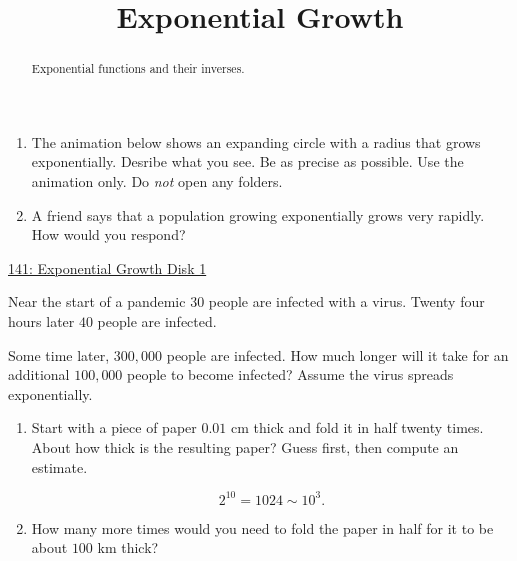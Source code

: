 \documentclass{ximera}
\title{Exponential Growth}
\begin{document}
\begin{abstract}
Exponential functions and their inverses.
\end{abstract}
\maketitle

\begin{exploration}  \label{Edftrg455}

\begin{enumerate}
\item The animation below shows an expanding circle with a radius that grows exponentially. Desribe what you see. Be as precise as possible. Use the animation only. Do \emph{not} open any folders.
\begin{freeResponse}
\end{freeResponse}

\item A friend says that a population growing exponentially grows very rapidly. How would you respond?
\begin{freeResponse}
\end{freeResponse}

\end{enumerate}


\begin{onlineOnly}
    \begin{center}
\end{center}
\end{onlineOnly}

\href{https://www.desmos.com/calculator/8k0cwumzso}{141: Exponential Growth Disk 1}

\end{exploration}

\begin{exploration}  \label{E5545636521}
Near the start of a pandemic $30$ people are infected with a virus. Twenty four hours later $40$ people are infected. 

Some time later, $300,000$ people are infected. How much longer will it take for an additional $100,000$ people to become infected? Assume the virus spreads exponentially. 
\end{exploration}

\begin{example} \label{Ed45345trt65tr5t}
\begin{enumerate}
\item Start with a piece of paper $0.01$ cm thick and fold it in half twenty times. About how thick is the resulting paper? Guess first, then compute an estimate.
\begin{hint}
\[
    2^{10} = 1024 \sim 10^3 .
\]
\end{hint}

\item How many more times would you need to fold the paper in half for it to be about $100$ km thick?
\end{enumerate}
\end{example}
\end{document}

